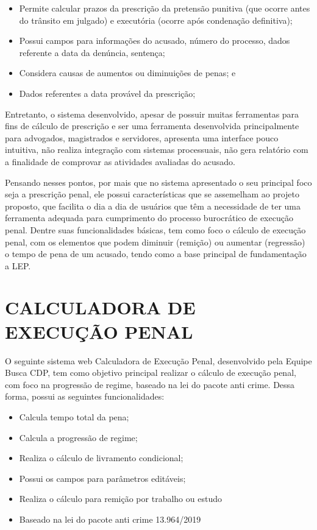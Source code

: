\begin{itemize}
\item Permite calcular prazos da prescrição da pretensão punitiva (que ocorre antes do trânsito em julgado) e executória (ocorre após condenação definitiva);

\item Possui campos para informações do acusado, número do processo, dados referente a data da denúncia, sentença;

\item Considera causas de aumentos ou diminuições de penas; e

\item Dados referentes a data provável da prescrição; 
\end{itemize}

Entretanto, o sistema desenvolvido, apesar de possuir muitas ferramentas para fins de cálculo de prescrição e ser uma ferramenta desenvolvida principalmente para advogados, magistrados e servidores, apresenta uma interface pouco intuitiva, não realiza integração com sistemas processuais, não gera relatório com a finalidade de comprovar as atividades avaliadas do acusado.

Pensando nesses pontos, por mais que no sistema apresentado o seu principal foco seja a prescrição penal, ele possui características que se assemelham ao projeto proposto, que facilita o dia a dia de usuários que têm a necessidade de ter uma ferramenta adequada para cumprimento do processo burocrático de execução penal. Dentre suas funcionalidades básicas, tem como foco o cálculo de execução penal, com os elementos que podem diminuir (remição) ou aumentar (regressão) o tempo de pena de um acusado, tendo como a base principal de fundamentação a LEP.

\section{CALCULADORA DE EXECUÇÃO PENAL}
O seguinte sistema web Calculadora de Execução Penal, desenvolvido pela Equipe Busca CDP, tem como objetivo principal realizar o cálculo de execução penal, com foco na progressão de regime, baseado na lei do pacote anti crime. Dessa forma, possui as seguintes funcionalidades:\cite{buscacdp}

\begin{itemize}
    \item Calcula tempo total da pena;
    \item Calcula a progressão de regime;
    \item Realiza o cálculo de livramento condicional;
    \item Possui os campos para parâmetros editáveis;
    \item Realiza o cálculo para remição por trabalho ou estudo
    \item Baseado na lei do pacote anti crime 13.964/2019 \cite{pacoteAnticrime}
\end{itemize}

